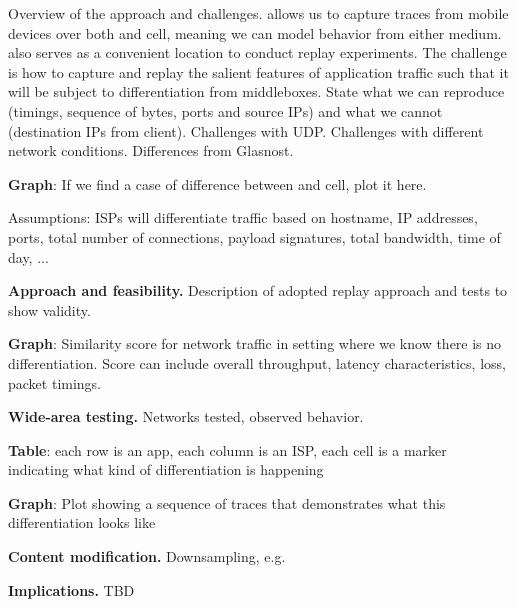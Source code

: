 Overview of the approach and challenges. \meddle allows us to capture 
traces from mobile devices over both \wifi and cell, meaning we can model 
behavior from either medium. \meddle also serves as a convenient location 
to conduct replay experiments. The challenge is how to capture and replay 
the salient features of application traffic such that it will be subject to differentiation 
from middleboxes. State what we can reproduce (timings, sequence of bytes, ports and source IPs) 
and what we cannot (destination IPs from client). Challenges with UDP. Challenges 
with different network conditions. Differences from Glasnost.

\textbf{Graph}: If we find a case of difference between \wifi and cell, plot it here.

Assumptions: ISPs will differentiate traffic based on hostname, IP addresses, ports, total number of 
connections, payload signatures, total bandwidth, time of day, ... 

\noindent\textbf{Approach and feasibility.}
Description of adopted replay approach and tests to show validity.

\textbf{Graph}: Similarity score for network traffic in setting where we know there is no differentiation. 
Score can include overall throughput, latency characteristics, loss, packet timings.

\noindent\textbf{Wide-area testing.} Networks tested, observed behavior.

\textbf{Table}: each row is an app, each column is an ISP, each cell is a marker indicating what kind of 
differentiation is happening

\textbf{Graph}: Plot showing a sequence of traces that demonstrates what this differentiation looks like



\noindent\textbf{Content modification.} Downsampling, e.g.

\noindent\textbf{Implications.}  TBD 
